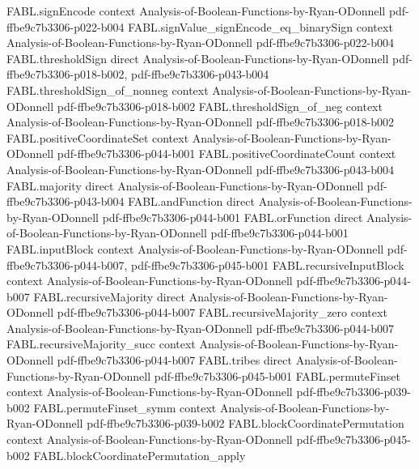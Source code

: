 \begin{theorem}
\proofstep
  {FABL.signEncode}
  {context}
  {Analysis-of-Boolean-Functions-by-Ryan-ODonnell}
  {pdf-ffbe9c7b3306-p022-b004}
\proofstep
  {FABL.signValue_signEncode_eq_binarySign}
  {context}
  {Analysis-of-Boolean-Functions-by-Ryan-ODonnell}
  {pdf-ffbe9c7b3306-p022-b004}
\proofstep
  {FABL.thresholdSign}
  {direct}
  {Analysis-of-Boolean-Functions-by-Ryan-ODonnell}
  {pdf-ffbe9c7b3306-p018-b002,
    pdf-ffbe9c7b3306-p043-b004}
\proofstep
  {FABL.thresholdSign_of_nonneg}
  {context}
  {Analysis-of-Boolean-Functions-by-Ryan-ODonnell}
  {pdf-ffbe9c7b3306-p018-b002}
\proofstep
  {FABL.thresholdSign_of_neg}
  {context}
  {Analysis-of-Boolean-Functions-by-Ryan-ODonnell}
  {pdf-ffbe9c7b3306-p018-b002}
\proofstep
  {FABL.positiveCoordinateSet}
  {context}
  {Analysis-of-Boolean-Functions-by-Ryan-ODonnell}
  {pdf-ffbe9c7b3306-p044-b001}
\proofstep
  {FABL.positiveCoordinateCount}
  {context}
  {Analysis-of-Boolean-Functions-by-Ryan-ODonnell}
  {pdf-ffbe9c7b3306-p043-b004}
\proofstep
  {FABL.majority}
  {direct}
  {Analysis-of-Boolean-Functions-by-Ryan-ODonnell}
  {pdf-ffbe9c7b3306-p043-b004}
\proofstep
  {FABL.andFunction}
  {direct}
  {Analysis-of-Boolean-Functions-by-Ryan-ODonnell}
  {pdf-ffbe9c7b3306-p044-b001}
\proofstep
  {FABL.orFunction}
  {direct}
  {Analysis-of-Boolean-Functions-by-Ryan-ODonnell}
  {pdf-ffbe9c7b3306-p044-b001}
\proofstep
  {FABL.inputBlock}
  {context}
  {Analysis-of-Boolean-Functions-by-Ryan-ODonnell}
  {pdf-ffbe9c7b3306-p044-b007,
    pdf-ffbe9c7b3306-p045-b001}
\proofstep
  {FABL.recursiveInputBlock}
  {context}
  {Analysis-of-Boolean-Functions-by-Ryan-ODonnell}
  {pdf-ffbe9c7b3306-p044-b007}
\proofstep
  {FABL.recursiveMajority}
  {direct}
  {Analysis-of-Boolean-Functions-by-Ryan-ODonnell}
  {pdf-ffbe9c7b3306-p044-b007}
\proofstep
  {FABL.recursiveMajority_zero}
  {context}
  {Analysis-of-Boolean-Functions-by-Ryan-ODonnell}
  {pdf-ffbe9c7b3306-p044-b007}
\proofstep
  {FABL.recursiveMajority_succ}
  {context}
  {Analysis-of-Boolean-Functions-by-Ryan-ODonnell}
  {pdf-ffbe9c7b3306-p044-b007}
\proofstep
  {FABL.tribes}
  {direct}
  {Analysis-of-Boolean-Functions-by-Ryan-ODonnell}
  {pdf-ffbe9c7b3306-p045-b001}
\proofstep
  {FABL.permuteFinset}
  {context}
  {Analysis-of-Boolean-Functions-by-Ryan-ODonnell}
  {pdf-ffbe9c7b3306-p039-b002}
\proofstep
  {FABL.permuteFinset_symm}
  {context}
  {Analysis-of-Boolean-Functions-by-Ryan-ODonnell}
  {pdf-ffbe9c7b3306-p039-b002}
\proofstep
  {FABL.blockCoordinatePermutation}
  {context}
  {Analysis-of-Boolean-Functions-by-Ryan-ODonnell}
  {pdf-ffbe9c7b3306-p045-b002}
\proofstep
  {FABL.blockCoordinatePermutation_apply}

\end{theorem}
